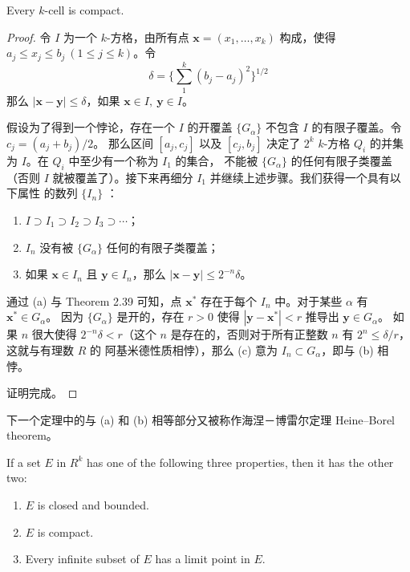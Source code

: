 \documentclass[../poma-notes.tex]{subfiles}
\begin{document}
\begin{theorem}
  Every $k$-cell is compact.
\end{theorem}

\begin{proof}
  令 $I$ 为一个 $k$-方格，由所有点 $\mathbf{x}=(x_1,\dots,x_k)$ 构成，使得 $a_j \le x_j \le b_j \ (1 \le j \le k)$。令
  \[\delta = \{\sum_{1}^{k}(b_j - a_j)^2\}^{1/2}\]
  那么 $|\mathbf{x} - \mathbf{y}| \le \delta$，如果 $\mathbf{x} \in I,\ \mathbf{y} \in I$。

  假设为了得到一个悖论，存在一个 $I$ 的开覆盖 $\{G_{\alpha}\}$ 不包含 $I$ 的有限子覆盖。令 $c_j = (a_j + b_j) / 2$。
  那么区间 $[a_j, c_j]$ 以及 $[c_j, b_j]$ 决定了 $2^k$ $k$-方格 $Q_i$ 的并集为 $I$。在 $Q_i$ 中至少有一个称为 $I_1$ 的集合，
  不能被 $\{G_{\alpha}\}$ 的任何有限子类覆盖（否则 $I$ 就被覆盖了）。接下来再细分 $I_1$ 并继续上述步骤。我们获得一个具有以下属性
  的数列 $\{I_n\}$ ：
  \begin{enumerate}[label=(\alph*)]
    \item $I \supset I_1 \supset I_2 \supset I_3 \supset \cdots$；
    \item $I_n$ 没有被 $\{G_{\alpha}\}$ 任何的有限子类覆盖；
    \item 如果 $\mathbf{x} \in I_n$ 且 $\mathbf{y} \in I_n$，那么 $|\mathbf{x} - \mathbf{y}| \le 2^{-n} \delta$。
  \end{enumerate}

  通过 (a) 与 Theorem 2.39 可知，点 $\mathbf{x}^*$ 存在于每个 $I_n$ 中。对于某些 $\alpha$ 有 $\mathbf{x}^* \in G_{\alpha}$。
  因为 $\{G_{\alpha}\}$ 是开的，存在 $r>0$ 使得 $|\mathbf{y} - \mathbf{x}^*| < r$ 推导出 $\mathbf{y} \in G_{\alpha}$。
  如果 $n$ 很大使得 $2^{-n}\delta<r$（这个 $n$ 是存在的，否则对于所有正整数 $n$ 有 $2^{n} \le \delta/r$，这就与有理数 $R$ 的
  阿基米德性质相悖），那么 (c) 意为 $I_n \subset G_{\alpha}$，即与 (b) 相悖。

  证明完成。
\end{proof}

下一个定理中的与 (a) 和 (b) 相等部分又被称作海涅－博雷尔定理 Heine–Borel theorem。

\begin{theorem}
  If a set $E$ in $R^k$ has one of the following three properties, then it has the other two:
  \begin{enumerate}[label=(\alph*)]
    \item $E$ is closed and bounded.
    \item $E$ is compact.
    \item Every infinite subset of $E$ has a limit point in $E$.
  \end{enumerate}
\end{theorem}
\end{document}

